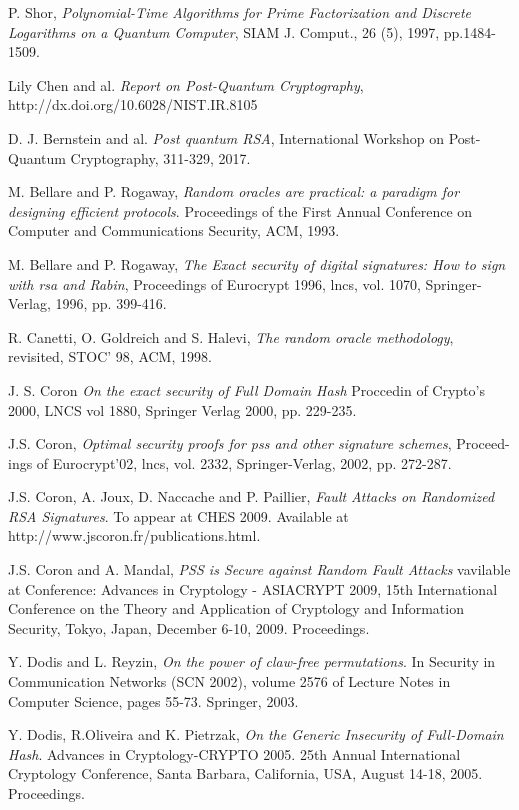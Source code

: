 \documentclass[a4paper,11pt]{article}
\begin{document}
\begin{thebibliography}{10}
 P. Shor,
\emph{ Polynomial-Time Algorithms for Prime Factorization and Discrete Logarithms on a Quantum Computer},  SIAM J. Comput., 26 (5), 1997, pp.1484-1509. 

 Lily Chen and al.
\emph{Report on Post-Quantum Cryptography}, http://dx.doi.org/10.6028/NIST.IR.8105

D. J. Bernstein and al.
\emph{Post quantum RSA},
International Workshop on Post-Quantum Cryptography, 311-329, 2017.
 
 M. Bellare and P. Rogaway, \emph{Random oracles are practical: a paradigm for designing
efficient protocols}. Proceedings of the First Annual Conference on Computer and Communications Security, ACM, 1993.

 M. Bellare and P. Rogaway, \emph{The Exact security of digital signatures: How to sign
with rsa and Rabin}, Proceedings of Eurocrypt 1996, lncs, vol. 1070, Springer-Verlag, 1996, pp. 399-416.

 R. Canetti, O. Goldreich and S. Halevi, \emph{The random oracle methodology}, revisited,
STOC' 98, ACM, 1998.

 J. S. Coron \emph{On the exact security of Full Domain Hash} Proccedin of Crypto's 2000, LNCS vol 1880,  Springer Verlag 2000, pp. 229-235.

 J.S. Coron,\emph{ Optimal security proofs for pss and other signature schemes}, Proceed-
ings of Eurocrypt'02, lncs, vol. 2332, Springer-Verlag, 2002, pp. 272-287.

 J.S. Coron, A. Joux, D. Naccache and P. Paillier, \emph{Fault Attacks on Randomized RSA Signatures}. To appear at CHES 2009. Available at http://www.jscoron.fr/publications.html.

 J.S. Coron and A. Mandal, \emph{PSS is Secure against Random Fault Attacks} vavilable at Conference: Advances in Cryptology - ASIACRYPT 2009, 15th International Conference on the Theory and Application of Cryptology and Information Security, Tokyo, Japan, December 6-10, 2009. Proceedings.

 Y. Dodis and L. Reyzin, \emph{On the power of claw-free permutations}. In Security in Communication Networks (SCN 2002), volume 2576 of Lecture Notes in Computer Science, pages 55-73. Springer, 2003.


 Y. Dodis,  R.Oliveira and K. Pietrzak, \emph{On the Generic Insecurity of Full-Domain Hash}. Advances in Cryptology-CRYPTO 2005. 25th Annual International Cryptology Conference, Santa Barbara, California, USA, August 14-18, 2005. Proceedings.


\end{thebibliography}
\end{document}
